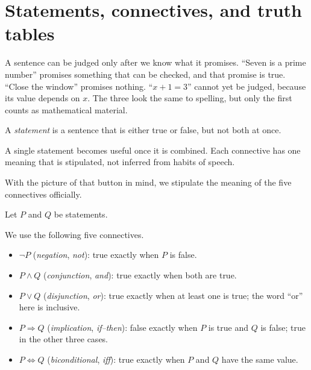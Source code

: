\section{Statements, connectives, and truth tables}

A sentence can be judged only after we know what it promises. ``Seven is a
prime number'' promises something that can be checked, and that promise is true. ``Close
the window'' promises nothing. ``$x+1=3$'' cannot yet be judged, because its value
depends on $x$. The three look the same to spelling, but only the first
counts as mathematical material.

\begin{definisi}[Statement]
A \emph{statement} is a sentence that is either true or false, but not
both at once.
\end{definisi}

A single statement becomes useful once it is combined. Each connective has one meaning
that is stipulated, not inferred from habits of speech.


With the picture of that button in mind, we stipulate the meaning of the five connectives officially.

\begin{definisi}
Let $P$ and $Q$ be statements.

We use the following five connectives.
\begin{itemize}
  \item $\neg P$ (\emph{negation}, \emph{not}): true exactly when $P$ is false.
  \item $P \wedge Q$ (\emph{conjunction}, \emph{and}): true exactly when both are true.
  \item $P \vee Q$ (\emph{disjunction}, \emph{or}): true exactly when at least
        one is true; the word ``or'' here is inclusive.
  \item $P \Rightarrow Q$ (\emph{implication}, \emph{if--then}): false exactly when
        $P$ is true and $Q$ is false; true in the other three cases.
  \item $P \Leftrightarrow Q$ (\emph{biconditional}, \emph{iff}): true exactly when
        $P$ and $Q$ have the same value.
\end{itemize}
\end{definisi}

